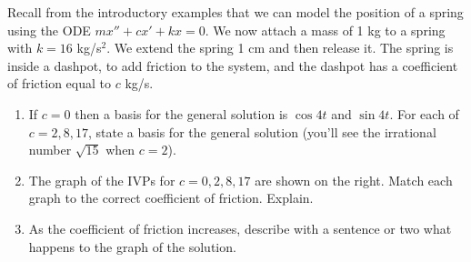 \begin{problem}
%
 Recall from the introductory examples that we can model the position of a spring using the ODE $mx''+cx'+kx=0$. 
 We now attach a mass of 1 kg to a spring with $k=16$ kg/s$^2$. We extend the spring 1 cm and then release it.  The spring is inside a dashpot, to add friction to the system, and the dashpot has a coefficient of friction equal to $c$ kg/s. 
\begin{enumerate}
 \item If $c=0$ then a basis for the general solution is $\cos 4t$ and $\sin 4t$.  For each of $c=2,8,17$, state a basis for the general solution (you'll see the irrational number $\sqrt{15}$ when $c=2$).  
 \item The graph of the IVPs for $c=0,2,8,17$ are shown on the right. Match each graph to the correct coefficient of friction. Explain.
 \item As the coefficient of friction increases, describe with a sentence or two what happens to the graph of the solution.
\end{enumerate}

\end{problem}




